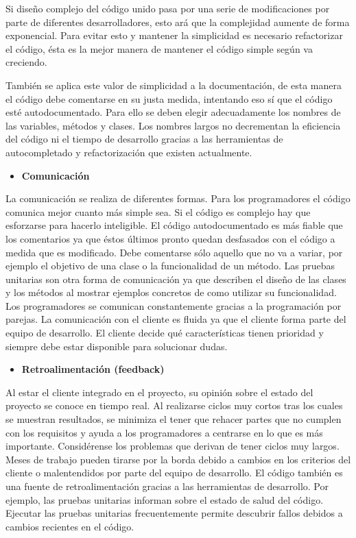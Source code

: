 \documentclass[12 pt, a4paper, twoside]{article}
\begin{document}
Si diseño complejo del código unido pasa por una serie de
modificaciones por parte de diferentes desarrolladores, esto ará que
la complejidad aumente de forma exponencial. Para evitar esto y
mantener la simplicidad es necesario refactorizar el código, ésta es
la mejor manera de mantener el código simple según va creciendo.

También se aplica este valor de simplicidad a la documentación, de esta manera el
código debe comentarse en su justa medida, intentando eso sí que
el código esté autodocumentado. Para ello se deben elegir
adecuadamente los nombres de las variables, métodos y clases. Los
nombres largos no decrementan la eficiencia del código ni el
tiempo de desarrollo gracias a las herramientas de autocompletado
y refactorización que existen actualmente.

\begin{itemize}
\item \textbf{Comunicación}
\end{itemize}
La comunicación se realiza de diferentes formas. Para los
programadores el código comunica mejor cuanto más simple sea. Si el
código es complejo hay que esforzarse para hacerlo inteligible. El
código autodocumentado es más fiable que los comentarios ya que éstos
últimos pronto quedan desfasados con el código a medida que es
modificado. Debe comentarse sólo aquello que no va a variar, por
ejemplo el objetivo de una clase o la funcionalidad de un método. Las
pruebas unitarias son otra forma de comunicación ya que describen el
diseño de las clases y los métodos al mostrar ejemplos concretos de
como utilizar su funcionalidad. Los programadores se comunican
constantemente gracias a la programación por parejas. La comunicación
con el cliente es fluida ya que el cliente forma parte del equipo de
desarrollo. El cliente decide qué características tienen prioridad y
siempre debe estar disponible para solucionar dudas.

\begin{itemize}
\item \textbf{Retroalimentación (feedback)}
\end{itemize}
Al estar el cliente integrado en el proyecto, su opinión sobre el
estado del proyecto se conoce en tiempo real. Al realizarse ciclos muy
cortos tras los cuales se muestran resultados, se minimiza el tener
que rehacer partes que no cumplen con los requisitos y ayuda a los
programadores a centrarse en lo que es más importante. Considérense
los problemas que derivan de tener ciclos muy largos. Meses de trabajo
pueden tirarse por la borda debido a cambios en los criterios del
cliente o malentendidos por parte del equipo de desarrollo. El código
también es una fuente de retroalimentación gracias a las herramientas
de desarrollo. Por ejemplo, las pruebas unitarias informan sobre el
estado de salud del código. Ejecutar las pruebas unitarias
frecuentemente permite descubrir fallos debidos a cambios recientes en
el código.
\end{document}
